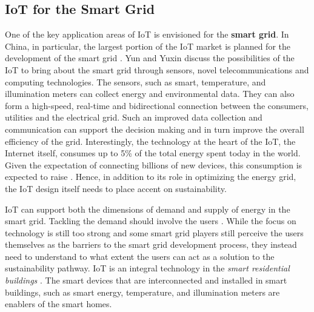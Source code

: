 \subsection{IoT for the Smart Grid}
\label{sec:IoTSG}
One of the key application areas of IoT is envisioned for the \textbf{smart grid}. In China, in particular, the largest portion of the IoT market is planned for the development of the smart grid \cite{shin2014socio}. Yun and Yuxin \cite{yun2010research} discuss the possibilities of the IoT to bring about the {smart grid} through sensors, novel telecommunications and computing technologies. The sensors, such as smart, temperature, and illumination meters can collect energy and environmental data. They can also form a high-speed, real-time and bidirectional connection between the consumers, utilities and the electrical grid. Such an improved data collection and communication can support the decision making and in turn improve the overall efficiency of the grid. Interestingly, the technology at the heart of the IoT, the Internet itself, consumes up to 5\% of the total energy spent today in the world. Given the expectation of connecting billions of new devices, this consumption is expected to raise \cite{gubbi2013internet}.	Hence, in addition to its role in optimizing the energy grid, the IoT design itself needs to place accent on sustainability.


 IoT can support both the dimensions of demand and supply of energy in the smart grid. Tackling the demand should involve the users \cite{verbong2013smart}. While the focus on technology is still too strong and some smart grid players still perceive the users themselves as the barriers to the smart grid development process, they instead need to understand to what extent the users can act as a solution to the sustainability pathway. IoT is an integral technology in the \textit{smart residential buildings} \cite{schatten2014smart,zygiaris2013smart}. The smart devices that are interconnected and installed in smart buildings, such as smart energy, temperature, and illumination meters are enablers of the smart homes.

